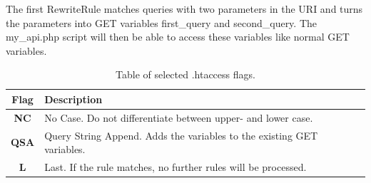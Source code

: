 The first RewriteRule matches queries with two parameters in the URI and turns the parameters into GET variables first\_query and second\_query. The my\_api.php script will then be able to access these variables like normal GET variables. 

\begin{table}
	\begin{center}
    \caption{Table of selected .htaccess flags.} 
		\begin{tabular}	{ | c | p{7cm} |}
		\hline
		\textbf{Flag} & \textbf{Description} \\ \hline
		\textbf{NC} & No Case. Do not differentiate between upper- and lower case. \\ \hline
		\textbf{QSA} & Query String Append. Adds the variables to the existing GET variables. \\ \hline
		\textbf{L} & Last. If the rule matches, no further rules will be processed. \\ \hline
		
		
		\end{tabular}
		
		\label{tbl:htaccess_flags}
	\end{center}
\end{table}
